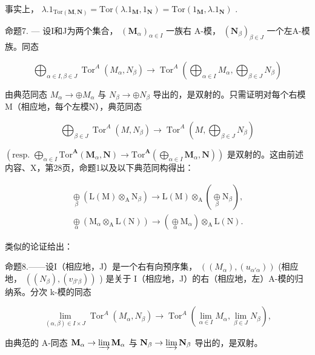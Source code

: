事实上， \(\lambda .1_{\mathrm{Tor}(\mathbf{M},\mathbf{N})} = \mathrm{Tor}(\lambda .1_{\mathbf{M}},1_{\mathbf{N}}) = \mathrm{Tor}(1_{\mathbf{M}},\lambda .1_{\mathbf{N}})\) .

命题7. --- 设I和J为两个集合， \((\mathbf{M}_{\alpha})_{\alpha \in I}\) 一族右 A-模， \((\mathbf{N}_{\beta})_{\beta \in J}\) 一个左A-模族。同态

\[
\bigoplus_ {\alpha \in I, \beta \in J} \operatorname{Tor} ^ {A} \left(M _ {\alpha}, N _ {\beta}\right)\rightarrow \operatorname{Tor} ^ {A} \left(\bigoplus_ {\alpha \in I} M _ {\alpha}, \bigoplus_ {\beta \in J} N _ {\beta}\right)
\]

由典范同态 \(M_{\alpha} \rightarrow \oplus M_{\alpha}\) 与 \(N_{\beta} \rightarrow \oplus N_{\beta}\) 导出的，是双射的。只需证明对每个右模M（相应地，每个左模N），典范同态

\[
\bigoplus_ {\beta \in J} \operatorname{Tor} ^ {A} (M, N _ {\beta}) \rightarrow \operatorname{Tor} ^ {A} (M, \bigoplus_ {\beta \in J} N _ {\beta})
\]

\((\text{resp. } \bigoplus_{\alpha \in I} \text{Tor}^{\mathbf{A}}(\mathbf{M}_{\alpha}, \mathbf{N}) \to \text{Tor}^{\mathbf{A}} (\bigoplus_{\alpha \in I} \mathbf{M}_{\alpha}, \mathbf{N}))\) 是双射的。这由前述内容、X，第28页，命题1以及以下典范同构得出：

\[
\begin{array}{l} \underset {\beta} {\oplus} (\mathrm{L(M)} \otimes_ {\mathrm{A}} \mathrm {N}_ {\beta}) \to \mathrm{L(M)} \otimes_ {\mathrm{A}} (\underset {\beta} {\oplus} \mathrm {N}_ {\beta}), \\ \underset {\alpha} {\oplus} (\mathrm {M}_ {\alpha} \otimes_ {\mathrm{A}} \mathrm{L(N)}) \to (\underset {\alpha} {\oplus} \mathrm {M}_ {\alpha}) \otimes_ {\mathrm{A}} \mathrm{L(N)}. \end{array}
\]

类似的论证给出：

命题8.——设I（相应地，J）是一个右有向预序集， \(((M_{\alpha}), (u_{\alpha' \alpha}))\) (相应地， \(((N_{\beta}), (v_{\beta' \beta}))\) ) 是关于 I（相应地，J）的右（相应地，左）A-模的归纳系。分次 k-模的同态

\[
\lim _ {(\alpha , \beta) \in I \times J} \operatorname{Tor} ^ {A} \left(M _ {\alpha}, N _ {\beta}\right)\rightarrow \operatorname{Tor} ^ {A} \left(\lim _ {\alpha \in I} M _ {\alpha}, \lim _ {\beta \in J} N _ {\beta}\right),
\]

由典范的 A-同态 \(\mathbf{M}_{\alpha} \to \varinjlim \mathbf{M}_{\alpha}\) 与 \(\mathbf{N}_{\beta} \to \varinjlim \mathbf{N}_{\beta}\) 导出的，是双射。

